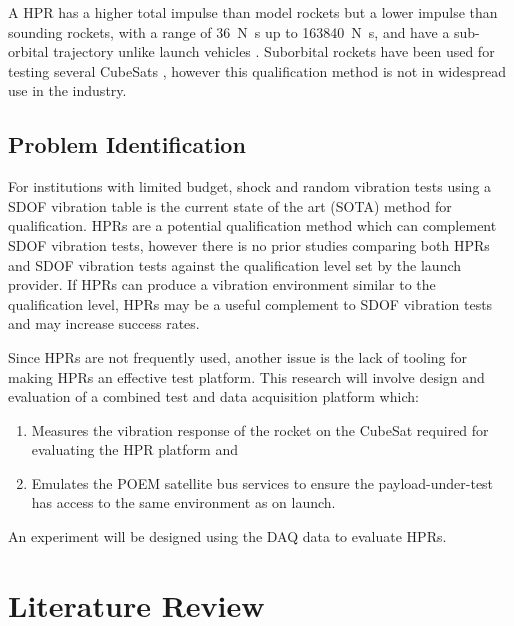\documentclass{report}
\begin{document}
A HPR has a higher total impulse than model rockets but a lower impulse than sounding rockets, with a range of \SI{36}{\newton\second} up to \SI{163840}{\newton\second}, and have a sub-orbital trajectory unlike launch vehicles \cite{pierce2019development}. Suborbital rockets have been used for testing several CubeSats \cite{9316404,minelli2019mobile}, however this qualification method is not in widespread use in the industry.

\section{Problem Identification}
For institutions with limited budget, shock and random vibration tests using a SDOF vibration table is the current state of the art (SOTA) method for qualification. HPRs are a potential qualification method which can complement SDOF vibration tests, however there is no prior studies comparing both HPRs and SDOF vibration tests against the qualification level set by the launch provider. If HPRs can produce a vibration environment similar to the qualification level, HPRs may be a useful complement to SDOF vibration tests and may increase success rates.

Since HPRs are not frequently used, another issue is the lack of tooling for making HPRs an effective test platform. This research will involve design and evaluation of a combined test and data acquisition platform which:
\begin{enumerate}
  \item Measures the vibration response of the rocket on the CubeSat required for evaluating the HPR platform and
  \item Emulates the POEM satellite bus services to ensure the payload-under-test has access to the same environment as on launch.
\end{enumerate}

An experiment will be designed using the DAQ data to evaluate HPRs.

\chapter{Literature Review}
\end{document}
